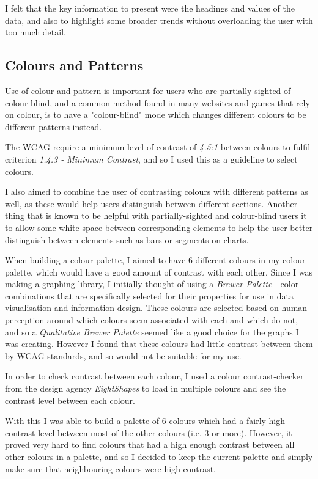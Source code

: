 \documentclass[ %
                    author={Aleena Baig},
                supervisor={Dr Simon Lock},
                    degree={BSc},
                     title={On Making Web Accessible Graphs},
                  subtitle={},
                      year={2019} ]{dissertation}
\begin{document}
I felt that the key information to present were the headings and values of the data, and also to highlight some broader trends without overloading the user with too much detail.


\subsection{Colours and Patterns}

Use of colour and pattern is important for users who are partially-sighted of colour-blind, and a common method found in many websites and games that rely on colour, is to have a "colour-blind" mode which changes different colours to be different patterns instead.

The WCAG require a minimum level of contrast of \textit{4.5:1} between colours to fulfil criterion \textit{1.4.3 - Minimum Contrast}, and so I used this as a guideline to select colours.

I also aimed to combine the user of contrasting colours with different patterns as well, as these would help users distinguish between different sections. Another thing that is known to be helpful with partially-sighted and colour-blind users it to allow some white space between corresponding elements to help the user better distinguish between elements such as bars or segments on charts.

When building a colour palette, I aimed to have 6 different colours in my colour palette, which would have a good amount of contrast with each other. Since I was making a graphing library, I initially thought of using a \textit{Brewer Palette} - color combinations that are specifically selected for their properties for use in data visualisation and information design. These colours are selected based on human perception around which colours seem associated with each and which do not, and so a \textit{Qualitative Brewer Palette} seemed like a good choice for the graphs I was creating. However I found that these colours had little contrast between them by WCAG standards, and so would not be suitable for my use.

In order to check contrast between each colour, I used a colour contrast-checker from the design agency \textit{EightShapes} to load in multiple colours and see the contrast level between each colour.


With this I was able to build a palette of 6 colours which had a fairly high contrast level between most of the other colours (i.e. 3 or more). However, it proved very hard to find colours that had a high enough contrast between all other colours in a palette, and so I decided to keep the current palette and simply make sure that neighbouring colours were high contrast.
\end{document}

